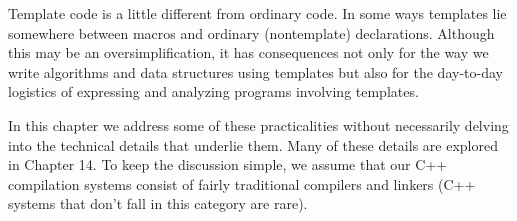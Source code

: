 Template code is a little different from ordinary code. In some ways templates lie somewhere between macros and ordinary (nontemplate) declarations. Although this may be an oversimplification, it has consequences not only for the way we write algorithms and data structures using templates but also for the day-to-day logistics of expressing and analyzing programs involving templates.

In this chapter we address some of these practicalities without necessarily delving into the technical details that underlie them. Many of these details are explored in Chapter 14. To keep the discussion simple, we assume that our C++ compilation systems consist of fairly traditional compilers and linkers (C++ systems that don’t fall in this category are rare).